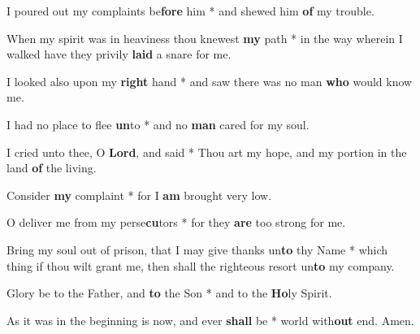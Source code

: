 \begin{multicols}{2}
	I poured out my complaints be\textbf{fore} him * and shewed him \textbf{of} my trouble.
	
	When my spirit was in heaviness thou knewest \textbf{my} path * in the way wherein I walked have they privily \textbf{laid} a snare for me.
	
	I looked also upon my \textbf{right} hand * and saw there was no man \textbf{who} would know me.
	
	I had no place to flee \textbf{un}to * and no \textbf{man} cared for my soul.
	
	I cried unto thee, O \textbf{Lord}, and said * Thou art my hope, and my portion in the land \textbf{of} the living.
	
	Consider \textbf{my} complaint * for I \textbf{am} brought very low.
	
	O deliver me from my perse\textbf{cu}tors * for they \textbf{are} too strong for me.
	
	Bring my soul out of prison, that I may give thanks un\textbf{to} thy Name * which thing if thou wilt grant me, then shall the righteous resort un\textbf{to} my company.
	
	Glory be to the Father, and \textbf{to} the Son * and to the \textbf{Ho}ly Spirit.
	
	As it was in the beginning is now, and ever \textbf{shall} be * world with\textbf{out} end. Amen.
\end{multicols}
